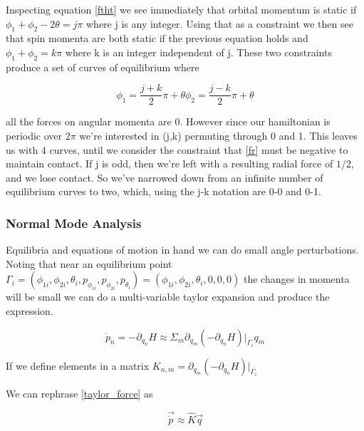 \documentclass[12pt]{amsart}
\begin{document}
Inspecting equation \ref{ftht} we see immediately that orbital momentum is static if $\phi_{1} + \phi_{2} - 2 \theta = j \pi$ where j is any integer. Using that as a constraint we then see that spin momenta are both static if the previous equation holds and $\phi_{1} + \phi_{2} = k\pi$ where k is an integer independent of j. These two constraints produce a set of curves of equilibrium where

\begin{subequations}
	\begin{equation}
		\phi_1 = \frac{j+k}{2}\pi +\theta
	\end{equation}
	\begin{equation}
		\phi_2 = \frac{j-k}{2}\pi +\theta
	\end{equation}
\end{subequations}

all the forces on angular momenta are 0. However since our hamiltonian is periodic over $2\pi$ we're interested in (j,k) permuting through 0 and 1. This leaves us with 4 curves, until we consider the constraint that \ref{fr} must be negative to maintain contact. If j is odd, then we're left with a resulting radial force of $1/2$, and we lose contact. So we've narrowed down from an infinite number of equilibrium curves to two, which, using the j-k notation are 0-0 and 0-1.



\subsubsection{Normal Mode Analysis}
Equilibria and equations of motion in hand we can do small angle perturbations. Noting that near an equilibrium point 
$\Gamma_i = 
(
\phi_{1i},\phi_{2i},\theta_{i},
p_{\phi_{1i}},p_{\phi_{2i}},p_{\theta_{i}}
)
=
(\phi_{1i},\phi_{2i},\theta_{i},0,0,0)
$ 
the changes in momenta will be small we can do a multi-variable taylor expansion and produce the expression.

\begin{equation}\label{taylor_force}
	\dot p_n 
	=
	-\partial_{q_n}H
	\approx 
	\Sigma_m \partial_{q_m}(-\partial_{q_n} H)|_{\Gamma_i} q_m 
\end{equation}

If we define elements in a matrix 
$K_{n,m}= \partial_{q_m}(-\partial_{q_n} H)|_{\Gamma_i}$

We can rephrase \ref{taylor_force} as 

\begin{equation} \label{matrix_force}
	\vec{ \dot{ p }} \approx \widehat K \vec q
\end{equation}
\end{document}
